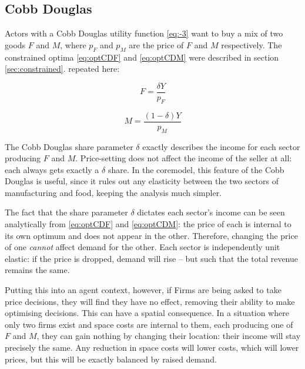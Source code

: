 \subsection{Cobb Douglas \label{sec:cobbdouglasresults}}

Actors with a Cobb Douglas utility function \eqref{eq:-3} want to buy a mix of two goods $F$ and $M$, where $p_F$ and $p_M$ are the price of $F$ and $M$ respectively. The constrained optima \eqref{eq:optCDF} and \eqref{eq:optCDM} were described in section \ref{sec:constrained}.  repeated here:

\begin{equation}
F=\frac{\delta Y}{p_F}\label{eq:optCDF}
\end{equation}
 
\begin{equation}
M=\frac{(1-\delta) Y}{p_M}\label{eq:optCDM}
\end{equation}

The Cobb Douglas share parameter $\delta$ exactly describes the income for each sector producing $F$ and $M$. Price-setting does not affect the income of the seller at all: each always gets exactly a $\delta$ share. In the \gls{coremodel}, this feature of the Cobb Douglas is useful, since it rules out any elasticity between the two sectors of manufacturing and food, keeping the analysis much simpler. 

The fact that the share parameter $\delta$ dictates each sector’s income can be seen analytically from \eqref{eq:optCDF} and \eqref{eq:optCDM}: the price of each is internal to its own optimum and does not appear in the other. Therefore, changing the price of one \emph{cannot} affect demand for the other. Each sector is independently unit elastic: if the price is dropped, demand will rise – but such that the total revenue remains the same.

Putting this into an agent context, however, if Firms are being asked to take price decisions, they will find they have no effect, removing their ability to make optimising decisions. This can have a spatial consequence. In a situation where only two firms exist and space costs are internal to them, each producing one of $F$ and $M$, they can gain nothing by changing their location: their income will stay precisely the same. Any reduction in space costs will lower costs, which will lower prices, but this will be exactly balanced by raised demand.

